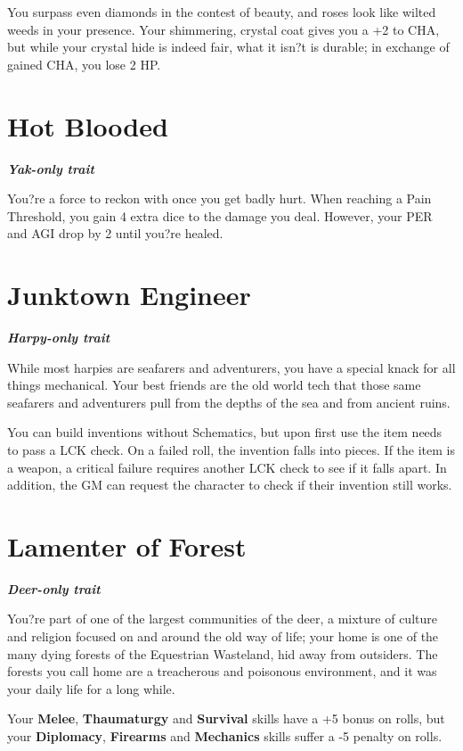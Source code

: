 \documentclass[11pt,a4paper,twocolumn]{book}
\begin{document}
	You surpass even diamonds in the contest of beauty, and roses look like wilted weeds in your presence. Your shimmering, crystal coat gives you a +2 to CHA, but while your crystal hide is indeed fair, what it isn?t is durable; in exchange of gained CHA, you lose 2 HP. 
	
	\section*{Hot Blooded}
	\emph{\textbf{Yak-only trait}}
	
	You?re a force to reckon with once you get badly hurt. When reaching a Pain Threshold, you gain 4 extra dice to the damage you deal. However, your PER and AGI drop by 2 until you?re healed.
	
	\section*{Junktown Engineer}
	\emph{\textbf{Harpy-only trait}}
	
	While most harpies are seafarers and adventurers, you have a special knack for all things mechanical. Your best friends are the old world tech that those same seafarers and adventurers pull from the depths of the sea and from ancient ruins. 
	
	You can build inventions without Schematics, but upon first use the item needs to pass a LCK check. On a failed roll, the invention falls into pieces. If the item is a weapon, a critical failure requires another LCK check to see if it falls apart. In addition, the GM can request the character to check if their invention still works.
	
	\section*{Lamenter of Forest}
	\emph{\textbf{Deer-only trait}}
	
	You?re part of one of the largest communities of the deer, a mixture of culture and religion focused on and around the old way of life; your home is one of the many dying forests of the Equestrian Wasteland, hid away from outsiders. The forests you call home are a treacherous and poisonous environment, and it was your daily life for a long while. 
	
	Your \textbf{Melee}, \textbf{Thaumaturgy} and \textbf{Survival} skills have a +5 bonus on rolls, but your \textbf{Diplomacy}, \textbf{Firearms} and \textbf{Mechanics} skills suffer a -5 penalty on rolls.
	
\end{document}

